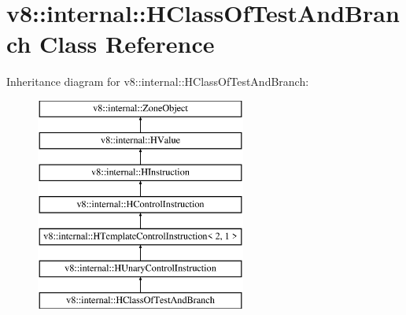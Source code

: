 \hypertarget{classv8_1_1internal_1_1_h_class_of_test_and_branch}{}\section{v8\+:\+:internal\+:\+:H\+Class\+Of\+Test\+And\+Branch Class Reference}
\label{classv8_1_1internal_1_1_h_class_of_test_and_branch}
Inheritance diagram for v8\+:\+:internal\+:\+:H\+Class\+Of\+Test\+And\+Branch\+:\begin{figure}[H]
\begin{center}
\leavevmode
\includegraphics[height=7.000000cm]{classv8_1_1internal_1_1_h_class_of_test_and_branch}
\end{center}
\end{figure}
